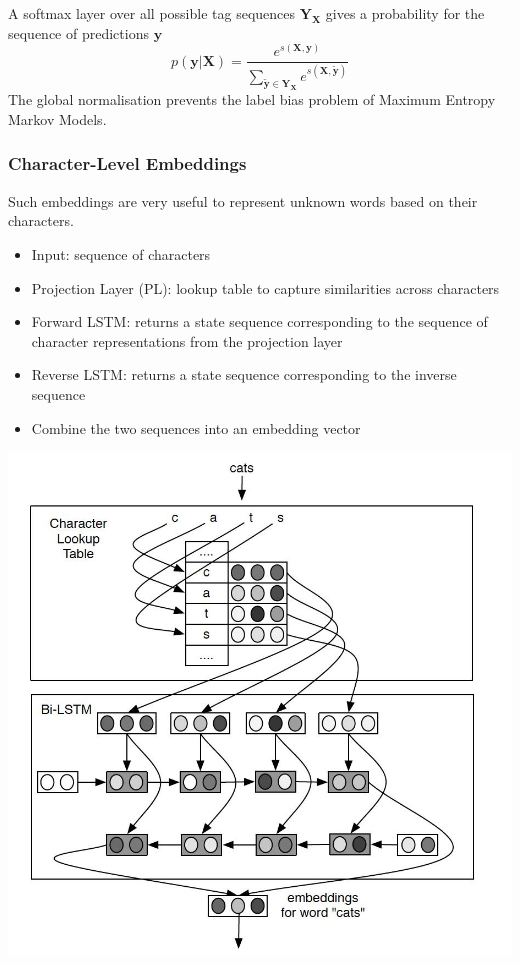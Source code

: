 \documentclass[11pt]{article}
\begin{document}
A softmax layer over all possible tag sequences $\textbf{Y}_{\textbf{X}}$ gives a probability for the sequence of predictions $\textbf{y}$
\begin{equation*}
	p(\textbf{y}|\textbf{X}) = \frac{e^{s(\textbf{X},\textbf{y})}}{\sum_{\tilde{\textbf{y}}\in\textbf{Y}_\textbf{X}} e^{s(\textbf{X},\tilde{\textbf{y}})}}
\end{equation*}
The global normalisation prevents the label bias problem of Maximum Entropy Markov Models.

\subsubsection{Character-Level Embeddings}
Such embeddings are very useful to represent unknown words based on their characters.

\vspace{1em}
\noindent
\begin{minipage}{0.6\linewidth}
	\begin{itemize}
		\item Input: sequence of characters
		\item Projection Layer (PL): lookup table to capture similarities across characters
		\item Forward LSTM: returns a state sequence corresponding to the sequence of character representations from the projection layer
		\item Reverse LSTM: returns a state sequence corresponding to the inverse sequence
		\item Combine the two sequences into an embedding vector
	\end{itemize}
\end{minipage}
\hspace{\fill}
\begin{minipage}{0.35\linewidth}
	\begin{center}
		\includegraphics[width=\linewidth]{img/BiLSTM_character_embedding}
	\end{center}
\end{minipage}



\clearpage
\printbibliography
\end{document}
